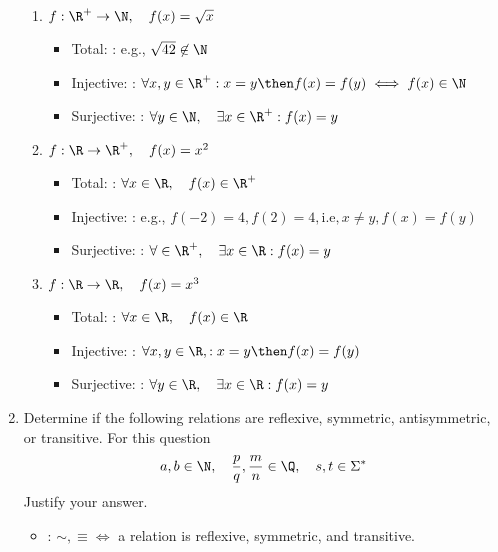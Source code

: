\documentclass[basic, header]{nosvagor-notes}
\begin{document}
\begin{enumerate}[itemsep=5em]
\begin{enumerate}
    \item \(f : \R^+ \to \N, \quad f(x) = \sqrt{x}\)
      \begin{itemize}
        \item Total: : e.g., \(\sqrt{42} \not\in \N\)
        \item Injective: : \(\forall x,y \in \R^+ : x = y \then f(x) = f(y) \iff f(x) \in \N \)
        \item Surjective: : \(\forall y \in \N, \quad \exists x \in \R^+ : f(x) = y \)
      \end{itemize}

    \item \(f : \R \to \R^+, \quad f(x) = x^2\)
      \begin{itemize}
        \item Total: : \(\forall x \in \R, \quad f(x) \in \R^+ \)
        \item Injective: : e.g., \(f(-2) = 4, f(2) = 4, \text{i.e}, x\neq y, f(x) = f(y)\)
        \item Surjective: : \(\forall \in \R^+, \quad \exists x \in \R : f(x) = y \)
      \end{itemize}

    \item \(f : \R \to \R, \quad f(x) = x^3\)
      \begin{itemize}
        \item Total: : \(\forall x \in \R, \quad  f(x) \in \R\)
        \item Injective: : \(\forall x, y \in \R, : x = y \then f(x) = f(y)\)
        \item Surjective: : \(\forall y \in \R, \quad \exists x \in \R : f(x) = y\)
      \end{itemize}

  \end{enumerate}

  \item Determine if the following relations are reflexive, symmetric,
    antisymmetric, or  transitive. For this question
    \[%
      a,b \in \N, \quad \frac{p}{q}, \frac{m}{n} \in \Q, \quad s, t\in \Sigma^*
    \]%
    Justify your answer.

    \begin{itemize}
      \item
        :
        \(\sim, \equiv \iff\) a relation is reflexive, symmetric, and transitive.


\end{itemize}
\end{enumerate}
\end{document}
